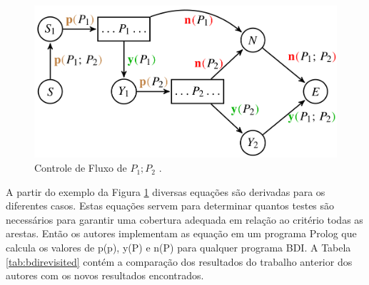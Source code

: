 \begin{figure}[ht]
\centering
\includegraphics[scale=0.3]{imagens/grafop1p2.png}
\caption{Controle de Fluxo de $P_{1};P_{2}$ \cite{winikoff2017bdi}.}
\label{fig:grafop1p2}
\end{figure}

A partir do exemplo da Figura \ref{fig:grafop1p2} diversas equações são derivadas para os diferentes casos. Estas equações servem para determinar quantos testes são necessários para garantir uma cobertura adequada em relação ao critério todas as arestas. Então os autores implementam as equação em um programa Prolog que calcula os valores de p(p), y(P) e n(P) para qualquer programa BDI. A Tabela \ref{tab:bdirevisited} contém a comparação dos resultados do trabalho anterior dos autores \cite{winikoff2014testability} com os novos resultados encontrados.

